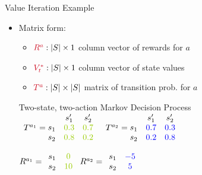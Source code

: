 \documentclass[11pt,table]{beamer}
\begin{document}
\begin{frame}{Value Iteration Example}
\begin{itemize}
    \item Matrix form: 

    \begin{itemize}
        \item[] $\textcolor{red1}{R^{a}}:|S| \times 1$ column vector of rewards for $a$ 
        
        \item[]$\textcolor{red1}{V_{t}^{*}}:|S| \times 1$ column vector of state values 
        
        \item[]$\textcolor{red1}{T^{a}}:|S| \times|S|$ matrix of transition prob. for $a$ 
    \end{itemize}
    \vspace{3mm}
		Two-state, two-action Markov Decision Process\\
    \vspace{3mm}
    $
\begin{array}{rcc}
&s_{1}^{\prime} & s_{2}^{\prime} \\
T^{a_{1}}=s_{1} & \textcolor{fu-green}{0.3} & \textcolor{fu-green}{0.7} \\
s_{2} & \textcolor{fu-green}{0.8} & \textcolor{fu-green}{0.2}
\end{array}
$
    \qquad $\begin{array}{rcc}
&s_{1}^{\prime} & s_{2}^{\prime} \\
T^{a_{2}}=s_{1} & \textcolor{blue}{0.7} & \textcolor{blue}{0.3} \\
s_{2} & \textcolor{blue}{0.2} & \textcolor{blue}{0.8}
\end{array}$

\vspace{3mm}
$
R^{a_{1}}=\begin{array}{cc}
s_{1} & \textcolor{fu-green}{0} \\
s_{2} & \textcolor{fu-green}{10}
\end{array}
$
\qquad \qquad \quad
$
R^{a_{2}}=\begin{array}{cc}
s_{1} & \textcolor{blue}{-5} \\
s_{2} & \textcolor{blue}{5}
\end{array}
$
\end{itemize}
    
\end{frame}
\end{document}
